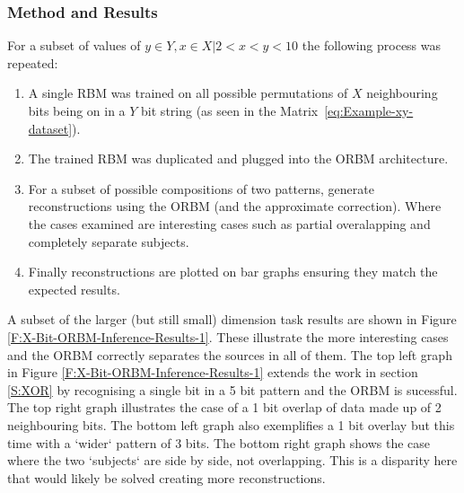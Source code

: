 \subsubsection{Method and Results}

For a subset of values of $y \in Y, x \in X | 2 < x < y < 10$ the following process was repeated:

\begin{enumerate}
  \item A single RBM was trained on all possible permutations of $X$ neighbouring bits being on in a $Y$ bit string (as seen in the Matrix~\ref{eq:Example-xy-dataset}).
  \item The trained RBM was duplicated and plugged into the ORBM architecture.
  \item For a subset of possible compositions of two patterns, generate reconstructions using the ORBM (and the approximate correction). Where the cases examined are interesting cases such as partial overalapping and completely separate subjects.
  \item Finally reconstructions are plotted on bar graphs ensuring they match the expected results.
\end{enumerate}

A subset of the larger (but still small) dimension task results are shown in Figure \ref{F:X-Bit-ORBM-Inference-Results-1}. These illustrate the more interesting cases and the ORBM correctly separates the sources in all of them. The top left graph in Figure \ref{F:X-Bit-ORBM-Inference-Results-1} extends the work in section \ref{S:XOR} by recognising a single bit in a 5 bit pattern and the ORBM is sucessful. The top right graph illustrates the case of a 1 bit overlap of data made up of 2 neighbouring bits. The bottom left graph also exemplifies a 1 bit overlay but this time with a `wider` pattern of 3 bits. The bottom right graph shows the case where the two `subjects` are side by side, not overlapping. This is a disparity here that would likely be solved creating more reconstructions.

